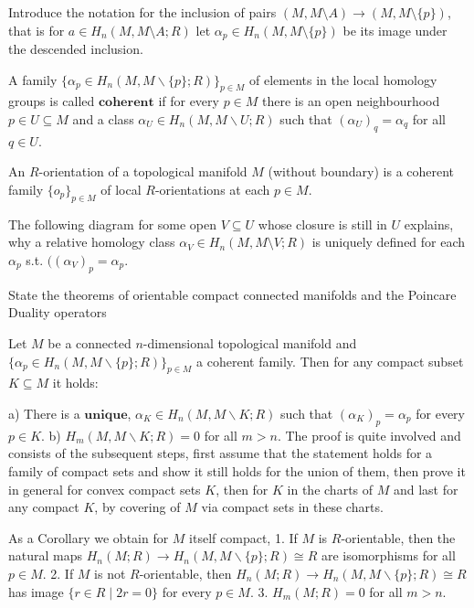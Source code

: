Introduce the notation for the inclusion of pairs \( (M, M \setminus A) \to (M, M \setminus \{p\}) \), that is for \( a \in H_n(M, M \setminus A;R) \)
let \( \alpha_p \in H_n(M, M \setminus \{p\}) \) be its image under the descended inclusion.

A family \(\{ \alpha_p \in H_n(M, M \backslash \{p\}; R) \}_{p \in M}\) of elements in the local homology groups is called \(\textbf{coherent}\) 
if for every \(p \in M\) there is an open neighbourhood \(p \in U \subseteq M\) and a class \(\alpha_U \in H_n(M, M \backslash U; R)\) 
such that \((\alpha_U)_q = \alpha_q\) for all \(q \in U\).

An \( R \)-orientation of a topological manifold \( M \) (without boundary) is a coherent family \( \{o_p\}_{p \in M} \) of local \( R \)-orientations at each \( p \in M \).

The following diagram for some open \( V \subseteq U \) whose closure is still in \( U \) explains, why a relative homology class \( \alpha_V \in H_n(M, M\setminus V; R)\)
is uniquely defined for each \( \alpha_p \) s.t. \( ((\alpha_V)_{p} = \alpha_p \).



State the theorems of orientable compact connected manifolds and the Poincare Duality operators

Let \(M\) be a connected \(n\)-dimensional topological manifold and 
\(\{\alpha_p \in H_n(M, M \backslash \{p\}; R)\}_{p \in M}\) a coherent family. Then for any compact subset \(K \subseteq M\) it holds:

a) There is a \( \textbf{unique} \), \(\alpha_K \in H_n(M, M \backslash K; R)\) such that \((\alpha_K)_p = \alpha_p\) for every \(p \in K\).
b) \(H_m(M, M \backslash K; R) = 0\) for all \(m > n\).
The proof is quite involved and consists of the subsequent steps, first assume that the statement holds for a family of compact sets and show it still holds for the union of them,
then prove it in general for convex compact sets \( K \), then
for \( K \) in the charts of \( M \) and last for any compact \( K \), by covering of \( M \) via compact sets in these charts.

As a Corollary we obtain for \( M \) itself compact,
1. If \(M\) is \(R\)-orientable, then the natural maps \(H_n(M; R) \to H_n(M, M \backslash \{p\}; R) \cong R\) are isomorphisms for all \(p \in M\).
2. If \(M\) is not \(R\)-orientable, then \(H_n(M; R) \to H_n(M, M \backslash \{p\}; R) \cong R\) has image \(\{r \in R \mid 2r = 0\}\) for every \(p \in M\).
3. \(H_m(M; R) = 0\) for all \(m > n\).

